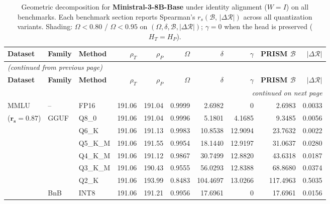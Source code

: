 \begingroup
\small
\setlength{\tabcolsep}{4pt}
\renewcommand{\arraystretch}{1.05}
\setlength{\LTcapwidth}{\textwidth}
\begin{longtable}{ll l rrrrrrr}
\caption{Geometric decomposition for \textbf{Ministral-3-8B-Base} under identity alignment ($W{=}I$) on all benchmarks. Each benchmark section reports Spearman's $r_s(\mathcal{B},\,|\Delta\mathcal{R}|)$ across all quantization variants. Shading: \colorbox{red!35}{$\Omega{<}0.80$} / \colorbox{red!18}{$\Omega{<}0.95$} on $(\Omega,\delta,\mathcal{B},|\Delta\mathcal{R}|)$; \colorbox{cyan!12}{$\gamma{=}0$} when the head is preserved ($H_T{=}H_P$).}\label{tab:mistral_decomposition_all_bound}\\
\toprule
\textbf{Dataset} & \textbf{Family} & \textbf{Method} & \textbf{$\rho_T$} & \textbf{$\rho_P$} & \textbf{$\Omega$} & \textbf{$\delta$} & \textbf{$\gamma$} & \textbf{PRISM $\mathcal{B}$} & \textbf{$|\Delta\mathcal{R}|$} \\
\midrule
\endfirsthead
\multicolumn{10}{l}{\small\itshape (continued from previous page)}\\
\toprule
\textbf{Dataset} & \textbf{Family} & \textbf{Method} & \textbf{$\rho_T$} & \textbf{$\rho_P$} & \textbf{$\Omega$} & \textbf{$\delta$} & \textbf{$\gamma$} & \textbf{PRISM $\mathcal{B}$} & \textbf{$|\Delta\mathcal{R}|$} \\
\midrule
\endhead
\midrule
\multicolumn{10}{r}{\small\itshape continued on next page}\\
\endfoot
\bottomrule
\endlastfoot
MMLU & -- & FP16 & 191.06 & 191.04 & 0.9999 & 2.6982 & \cellcolor{cyan!12} $0$ & 2.6983 & 0.0033 \\
{\small ($\mathbf{r_s{=}0.87}$)} & GGUF & Q8\_0 & 191.06 & 191.04 & 0.9996 & 5.1801 & 4.1685 & 9.3485 & 0.0056 \\
 &  & Q6\_K & 191.06 & 191.13 & 0.9983 & 10.8538 & 12.9094 & 23.7632 & 0.0022 \\
 &  & Q5\_K\_M & 191.06 & 191.55 & 0.9954 & 18.1440 & 12.9197 & 31.0637 & 0.0280 \\
 &  & Q4\_K\_M & 191.06 & 191.12 & 0.9867 & 30.7499 & 12.8820 & 43.6318 & 0.0187 \\
 &  & Q3\_K\_M & 191.06 & 190.43 & 0.9555 & 56.0293 & 12.8388 & 68.8680 & 0.0374 \\
 &  & Q2\_K & 191.06 & 193.99 & \cellcolor{red!18} 0.8483 & \cellcolor{red!18} 104.4697 & 13.0266 & \cellcolor{red!18} 117.4963 & \cellcolor{red!18} 0.5035 \\
 & BnB & INT8 & 191.06 & 191.21 & 0.9956 & 17.6961 & \cellcolor{cyan!12} $0$ & 17.6961 & 0.0156 \\

\end{longtable}
